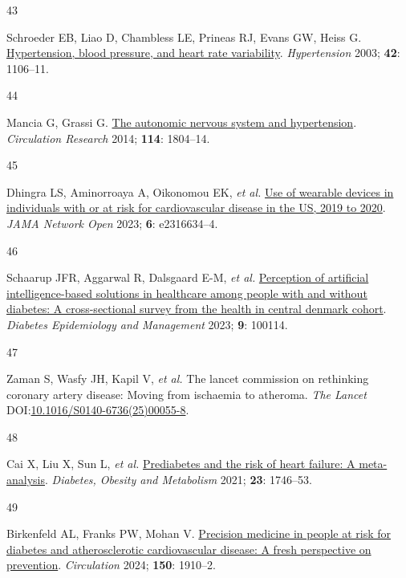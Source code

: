 \documentclass[
  a4paper,
  headsepline=true,
  open=any]{scrbook}
\newlength{\cslhangindent}
\newlength{\csllabelwidth}
\newlength{\cslentryspacingunit} %
\newenvironment{CSLReferences}[2] %
 {%
  \setlength{\parindent}{0pt}
  \ifodd #1
  \let\oldpar\par
  \def\par{\hangindent=\cslhangindent\oldpar}
  \fi
  \setlength{\parskip}{#2\cslentryspacingunit}
 }%
 {}
\newcommand{\CSLLeftMargin}[1]{\parbox[t]{\csllabelwidth}{#1}}
\newcommand{\CSLRightInline}[1]{\parbox[t]{\linewidth - \csllabelwidth}{#1}\break}
\begin{document}
\begin{CSLReferences}{0}{0}
\leavevmode{}%
\CSLLeftMargin{43 }%
\CSLRightInline{Schroeder EB, Liao D, Chambless LE, Prineas RJ, Evans
GW, Heiss G.
\href{https://doi.org/doi:10.1161/01.HYP.0000100444.71069.73}{Hypertension,
blood pressure, and heart rate variability}. \emph{Hypertension} 2003;
\textbf{42}: 1106--11.}

\leavevmode{}%
\CSLLeftMargin{44 }%
\CSLRightInline{Mancia G, Grassi G.
\href{https://doi.org/10.1161/CIRCRESAHA.114.302524}{The autonomic
nervous system and hypertension}. \emph{Circulation Research} 2014;
\textbf{114}: 1804--14.}

\leavevmode{}%
\CSLLeftMargin{45 }%
\CSLRightInline{Dhingra LS, Aminorroaya A, Oikonomou EK, \emph{et al.}
\href{https://doi.org/10.1001/jamanetworkopen.2023.16634}{Use of
wearable devices in individuals with or at risk for cardiovascular
disease in the US, 2019 to 2020}. \emph{JAMA Network Open} 2023;
\textbf{6}: e2316634--4.}

\leavevmode{}%
\CSLLeftMargin{46 }%
\CSLRightInline{Schaarup JFR, Aggarwal R, Dalsgaard E-M, \emph{et al.}
\href{https://doi.org/10.1016/j.deman.2022.100114}{Perception of
artificial intelligence-based solutions in healthcare among people with
and without diabetes: A cross-sectional survey from the health in
central denmark cohort}. \emph{Diabetes Epidemiology and Management}
2023; \textbf{9}: 100114.}

\leavevmode{}%
\CSLLeftMargin{47 }%
\CSLRightInline{Zaman S, Wasfy JH, Kapil V, \emph{et al.} The lancet
commission on rethinking coronary artery disease: Moving from ischaemia
to atheroma. \emph{The Lancet}
DOI:\href{https://doi.org/10.1016/S0140-6736(25)00055-8}{10.1016/S0140-6736(25)00055-8}.}

\leavevmode{}%
\CSLLeftMargin{48 }%
\CSLRightInline{Cai X, Liu X, Sun L, \emph{et al.}
\href{https://doi.org/10.1111/dom.14388}{Prediabetes and the risk of
heart failure: A meta-analysis}. \emph{Diabetes, Obesity and Metabolism}
2021; \textbf{23}: 1746--53.}

\leavevmode{}%
\CSLLeftMargin{49 }%
\CSLRightInline{Birkenfeld AL, Franks PW, Mohan V.
\href{https://doi.org/10.1161/CIRCULATIONAHA.124.070463}{Precision
medicine in people at risk for diabetes and atherosclerotic
cardiovascular disease: A fresh perspective on prevention}.
\emph{Circulation} 2024; \textbf{150}: 1910--2.}


\end{CSLReferences}
\end{document}
